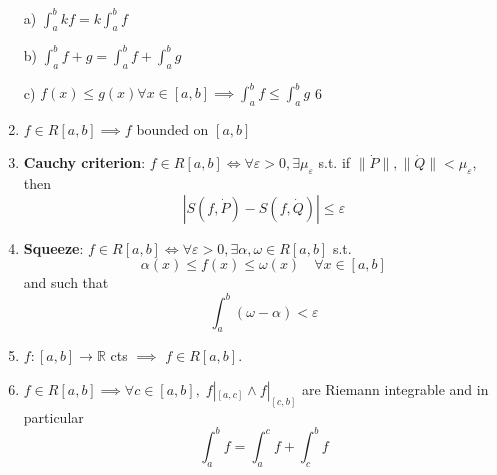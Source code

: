 \documentclass[10pt,landscape]{article}
\begin{document}
\begin{multicols}{3}
\begin{enumerate}
	a) $\int^b_a kf = k \int^b_a f$
	
	b) $\int^b_a f+g = \int^b_a f + \int^b_a g $
	
	c) $f(x) \leq g(x) \forall x \in [a,b] \implies \int^b_a f \leq \int^b_a g$
	6
	\item $f\in R[a,b] \implies f $ bounded on $[a,b]$ 
	
	\item \textbf{Cauchy criterion}: $f \in R[a,b] \iff \forall \varepsilon >0, \exists \mu_\varepsilon$ s.t. if $\|\dot{P} \| , \| \dot{Q}\| < \mu_\varepsilon$, then 
	$$| S(f, \dot{P} ) - S(f, \dot{Q} ) | \leq \varepsilon$$
	
	\item \textbf{Squeeze}: $f\in R[a,b] \iff \forall \varepsilon > 0, \exists \alpha, \omega \in R[a,b]$ s.t. 
	$$\alpha(x) \leq f(x) \leq \omega(x) \quad \forall x \in[a,b]$$
	and such that
	$$\int^b_a (\omega- \alpha ) < \varepsilon $$
	
	\item $f:[a,b] \rightarrow \mathbb{R}$ cts $\implies$ $f\in R[a,b]$.
	\item $f\in R[a,b] \implies \forall c \in [a,b], \; f|_{[a,c]} \land f|_{[c,b]}$ are Riemann integrable and in particular
	$$\int^b_a f = \int^c_a f + \int^b_c f$$
\end{enumerate}

\end{multicols}
\end{document}
